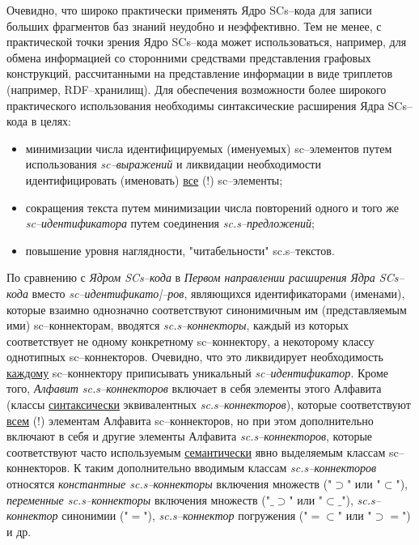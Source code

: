 Очевидно, что широко практически применять Ядро SCs--кода для записи больших фрагментов баз знаний неудобно и неэффективно. Тем не менее, с практической точки зрения Ядро SCs--кода может использоваться, например, для обмена информацией со сторонними средствами представления графовых конструкций, рассчитанными на представление информации в виде триплетов (например, RDF--хранилищ).
Для обеспечения возможности более широкого практического использования необходимы синтаксические расширения Ядра SCs--кода в целях:
\begin{itemize}
	\item минимизации числа идентифицируемых (именуемых) sc--элементов путем использования \textit{sc--выражений} и ликвидации необходимости идентифицировать (именовать) \uline{все} (!) sc--элементы;
	\item сокращения текста путем минимизации числа повторений одного и того же \textit{sc--идентификатора} путем соединения \textit{sc.s--предложений};
	\item повышение уровня наглядности, "читабельности"{} sc.s--текстов.
\end{itemize}

\begin{SCn}
\end{SCn}

По сравнению с \textit{Ядром SCs--кода} в \textit{Первом направлении расширения Ядра SCs--кода} вместо \textit{sc--идентификато|--ров}, являющихся идентификаторами (именами), которые взаимно однозначно соответствуют синонимичным им (представляемым ими) sc--коннекторам, вводятся \textit{sc.s--коннекторы}, каждый из которых соответствует не одному конкретному sc--коннектору, а некоторому классу однотипных sc--коннекторов. Очевидно, что это ликвидирует необходимость \uline{каждому} sc--коннектору приписывать уникальный \textit{sc--идентификатор}. Кроме того, \textit{Алфавит sc.s--коннекторов} включает в себя элементы этого Алфавита (классы \uline{синтаксически} эквивалентных \textit{sc.s--коннекторов}), которые соответствуют \uline{всем} (!) элементам Алфавита sc--коннекторов, но при этом дополнительно включают в себя и другие элементы Алфавита \textit{sc.s--коннекторов}, которые соответствуют часто используемым \uline{семантически} явно выделяемым классам sc--коннекторов. К таким дополнительно вводимым классам \textit{sc.s--коннекторов} относятся \textit{константные sc.s--коннекторы} включения множеств ("$\supset$"{} или "$\subset$"{}), \textit{переменные sc.s--коннекторы} включения множеств ("$\_\supset$"{} или "$\subset\_$"{}), \textit{sc.s--коннектор} синонимии ("$=$"{}), \textit{sc.s--коннектор} погружения ("$=\subset$"{} или "$\supset=$"{}) и др.

